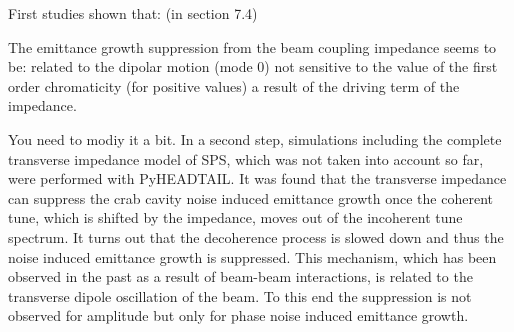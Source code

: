First studies shown that: (in section 7.4)

The emittance growth suppression from the beam coupling impedance seems to be:
related to the dipolar motion (mode 0)
not sensitive to the value of the first order chromaticity (for positive values)
a result of the driving term of the impedance.


You need to modiy it a bit.
In a second step, simulations including the complete transverse impedance model of SPS, which was not taken into account so far, were performed with PyHEADTAIL. It was found that the transverse impedance can suppress the crab cavity noise induced emittance growth once the coherent tune, which is shifted by the impedance, moves out of the incoherent tune spectrum. It turns out that the decoherence process is slowed down and thus the noise induced emittance growth is suppressed. This mechanism, which has been observed in the past as a result of beam-beam interactions, is related to the transverse dipole oscillation of the beam. To this end the suppression is not observed for amplitude but only for phase noise induced emittance growth.